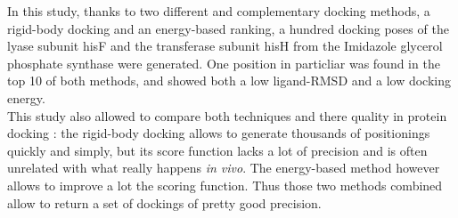 \documentclass[11pt]{article}
\begin{document}
In this study, thanks to two different and complementary docking
methods, a rigid-body docking and an energy-based ranking, a hundred
docking poses of the lyase subunit hisF and the transferase subunit hisH
from the Imidazole glycerol phosphate synthase were generated. One
position in particliar was found in the top 10 of both methods, and
showed both a low ligand-RMSD and a low docking energy.\\
This study also allowed to compare both techniques and there quality in
protein docking : the rigid-body docking allows to generate thousands of
positionings quickly and simply, but its score function lacks a lot of
precision and is often unrelated with what really happens \emph{in
vivo}. The energy-based method however allows to improve a lot the
scoring function. Thus those two methods combined allow to return a set
of dockings of pretty good precision.


    
    
    
    
\end{document}

